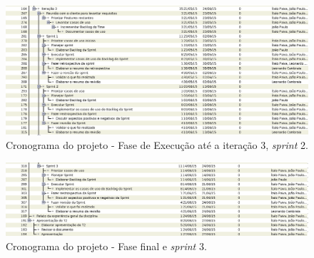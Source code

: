   \pagebreak
  \begin{figure}[!htbp]
    \centering
    \includegraphics[scale=0.5, angle = 90]{editaveis/figuras/cronograma_3}
    \caption[Cronograma - Fase de Execução]{Cronograma do projeto - Fase de Execução até a iteração 3, \textit{sprint} 2.}
    \label{cronograma_3}
  \end{figure}
  
  \pagebreak
  \begin{figure}[!htbp]
    \centering
    \includegraphics[scale=0.5, angle = 90]{editaveis/figuras/cronograma_4}
    \caption[Cronograma - Fase de Finalização]{Cronograma do projeto - Fase final e \textit{sprint} 3.}
    \label{cronograma_4}
  \end{figure}